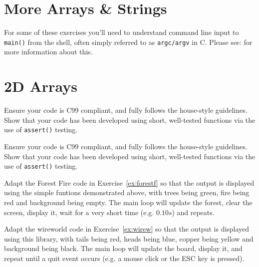 





\chapter{More Arrays \& Strings}

For some of these exercises you'll need to understand command line input to
\verb^main()^ from the shell, often simply referred to as \verb^argc/argv^ in C.
Please see:
for more information about this.







\chapter{2D Arrays}







\noindent Ensure your code is C99 compliant, and fully follows the house-style guidelines.
Show that your code has been developed using short, well-tested functions via the use of \verb^assert()^ testing.



\noindent Ensure your code is C99 compliant, and fully follows the house-style guidelines.
Show that your code has been developed using short, well-tested functions via the use of \verb^assert()^ testing.





%



\begin{exercise}
Adapt the Forest Fire code in Exercise~\ref{ex:forestf} so that the output
is displayed using the simple funtions demonstrated above, with trees being green, fire being red and
background being empty.  The main loop will
update the forest, clear the screen, display it, wait for a very short time (e.g. $0.10s$) and repeats.
\end{exercise}



\begin{exercise}
Adapt the wireworld code in Exercise~\ref{ex:wirew} so that the output
is displayed using this library, with tails being red, heads being blue,
copper being yellow and background being black.  The main loop will
update the board, display it, and repeat until a quit event occurs
(e.g. a mouse click or the ESC key is pressed).  \end{exercise}

